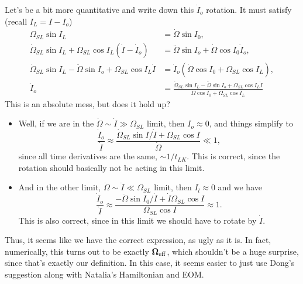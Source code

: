 \documentclass[11pt,
        usenames, %
        dvipsnames %
    ]{article}
\newcommand*{\bm}[1]{\boldsymbol{\mathbf{#1}}}
\newcommand*{\p}[1]{\left(#1\right)}
\begin{document}
Let's be a bit more quantitative and write down this $\dot{I}_o$ rotation. It
must satisfy (recall $I_L = I - I_o$)
\begin{align}
    \Omega_{SL}\sin I_L &= \dot{\Omega} \sin I_0,\\
    \dot{\Omega}_{SL}\sin I_L + \Omega_{SL}\cos I_L \p{\dot{I} - \dot{I}_o}
        &= \ddot{\Omega} \sin I_o + \dot{\Omega} \cos I_0 \dot{I}_o,\\
    \dot{\Omega}_{SL}\sin I_L - \ddot{\Omega} \sin I_o +
            \Omega_{SL}\cos I_L \dot{I}
        &= \dot{I}_o\p{\dot{\Omega} \cos I_0 + \Omega_{SL} \cos I_L},\\
    \dot{I}_o &= \frac{\dot{\Omega}_{SL}\sin I_L
            - \ddot{\Omega} \sin I_o
            + \Omega_{SL}\cos I_L \dot{I}}{
        \dot{\Omega} \cos I_0
            + \Omega_{SL} \cos I_L}
\end{align}
This is an absolute mess, but does it hold up?
\begin{itemize}
    \item Well, if we are in the $\dot{\Omega} \sim \dot{I} \gg \Omega_{SL}$
        limit, then $I_o \approx 0$, and things simplify to
        \begin{equation}
            \frac{\dot{I}_o}{\dot{I}} \approx
                \frac{\dot{\Omega}_{SL} \sin I / \dot{I} + \Omega_{SL}\cos I}
                {\dot{\Omega}} \ll 1,
        \end{equation}
        since all time derivatives are the same, $\sim 1/t_{LK}$. This is
        correct, since the rotation should basically not be acting in this
        limit.

    \item And in the other limit, $\dot{\Omega} \sim \dot{I} \ll
        \Omega_{SL}$ limit, then $I_l \approx 0$ and we have
        \begin{equation}
            \frac{\dot{I}_o}{\dot{I}} \approx
                \frac{-\ddot{\Omega}\sin I_0 / \dot{I}
                    + \dot{I} \Omega_{SL} \cos I}{
                        \Omega_{SL} \cos I}
                \approx 1.
        \end{equation}
        This is also correct, since in this limit we should have to rotate by
        $\dot{I}$.
\end{itemize}
Thus, it seems like we have the correct expression, as ugly as it is. In fact,
numerically, this turns out to be exactly $\bm{\Omega}_{\rm eff}$, which
shouldn't be a huge surprise, since that's exactly our definition. In this case,
it seems easier to just use Dong's suggestion along with Natalia's Hamiltonian
and EOM\@.
\end{document}
